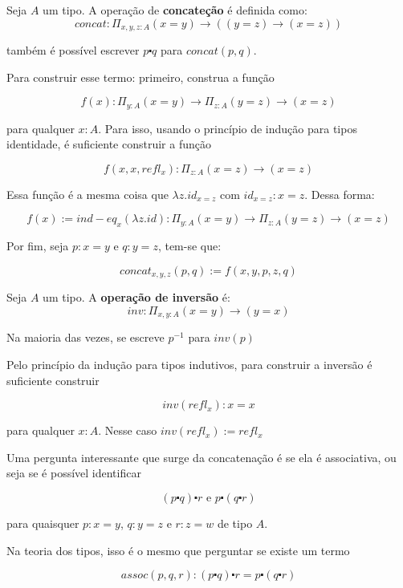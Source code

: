 \documentclass[../main.tex]{subfiles}
\begin{document}
\begin{definition}
    Seja $A$ um tipo. A operação de \textbf{concateção} é definida como:
    $$concat : \Pi_{x, y, z : A}(x = y) \to ((y = z) \to (x = z))$$
\end{definition}

também é possível escrever $p \centerdot q$ para $concat(p, q)$.

Para construir esse termo: primeiro, construa a função

$$f(x) : \Pi_{y  :A} (x = y) \to \Pi_{z : A} (y = z) \to (x = z)$$

para qualquer $x : A$. Para isso, usando o princípio de indução para tipos identidade, é suficiente construir a função

$$f(x, x, refl_x) : \Pi_{z  :A} (x = z) \to (x = z)$$

Essa função é a mesma coisa que $\lambda z . id_{x = z}$ com $id_{x = z} : x = z$. Dessa forma:

$$f(x) := ind-eq_x(\lambda z . id) : \Pi_{y  :A} (x = y) \to \Pi_{z : A} (y = z) \to (x = z)$$

Por fim, seja $p : x = y$ e $q : y = z$, tem-se que:

$$concat_{x, y, z} (p, q) := f(x, y, p, z, q)$$

\begin{definition}
    Seja $A$ um tipo. A \textbf{operação de inversão} é:
    $$inv : \Pi_{x, y : A} (x = y) \to (y = x)$$
\end{definition}

Na maioria das vezes, se escreve $p^{-1}$ para $inv(p)$

Pelo princípio da indução para tipos indutivos, para construir a inversão é suficiente construir

$$inv(refl_x) : x = x$$

para qualquer $x : A$. Nesse caso $inv(refl_x) := refl_x$

Uma pergunta interessante que surge da concatenação é se ela é associativa, ou seja se é possível identificar

$$(p \centerdot q) \centerdot r \text{  e  } p \centerdot (q \centerdot r)$$

para quaisquer $p : x = y$, $q : y = z$ e $r : z = w$ de tipo $A$.

Na teoria dos tipos, isso é o mesmo que perguntar se existe um termo

$$assoc(p, q, r) : (p \centerdot q) \centerdot r = p \centerdot (q \centerdot r)$$
\end{document}
